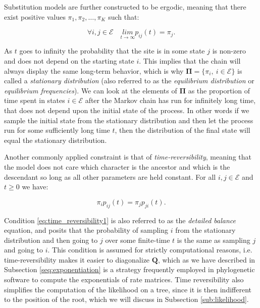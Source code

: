 \documentclass[12pt,twoside]{mitthesis}
\theoremstyle{plain}
\theoremstyle{definition}
\theoremstyle{remark}
\begin{document}
Substitution models are further constructed to be ergodic, meaning that there exist positive values $\pi_{1},\pi_{2},\ldots,\pi_{K}$ such that:

\begin{equation}
\forall i,j\in \mathcal{E}  \quad\underset{t\rightarrow\infty}{lim}p_{ij}(t)=\pi_{j}.
\label{eq:ergodicity}
\end{equation}

As $t$ goes to infinity the probability that the site is in some state $j$ is non-zero and does not depend on the starting state $i$.
This implies that the chain will always display the same long-term behavior, which is why $\mathbf{\Pi}=\{\pi_{i},\ i\in\mathcal{E}\}$ is called a \emph{stationary distribution} (also referred to as the \emph{equilibrium distribution} or \emph{equilibrium frequencies}).
We can look at the elements of $\mathbf{\Pi}$ as the proportion of time spent in states $i\in\mathcal{E}$ after the Markov chain has run for infinitely long time, that does not depend upon the initial state of the process.
In other words if we sample the initial state from the stationary distribution and then let the process run for some sufficiently long time $t$, then the distribution of the final state will equal the stationary distribution. 

Another commonly applied constraint is that of \emph{time-reversibility}, meaning that the model does not care which character is the ancestor and which is the descendant so long as all other parameters are held constant.
For all $i,j\in \mathcal{E}$ and $t\geq 0$ we have:

\begin{equation}
\pi_{i}p_{ij}(t)=\pi_{j}p_{ji}(t).
\label{eq:time_reversibility1}
\end{equation}

\noindent
Condition \ref{eq:time_reversibility1} is also referred to as the \emph{detailed balance} equation, and posits that the probability of sampling $i$ from the stationary distribution and then going to $j$ over some finite-time $t$ is the same as sampling $j$ and going to $i$. 
% 
% 
This condition is assumed for strictly computational reasons, i.e. time-reversibility makes it easier to diagonalize $\mathbf{Q}$, which as we have described in 
Subsection \ref{seq:exponentiation} is a strategy frequently employed in phylogenetic software to compute the exponentials of rate matrices.
Time reversibility also simplifies the computation of the likelihood on a tree, since it is then indifferent to the position of the root, which we will discuss in Subsection \ref{sub:likelihood}.
\end{document}
